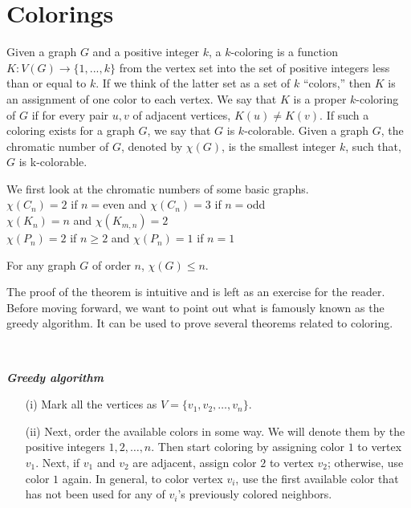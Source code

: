 \documentclass[../basic_graph_theory.tex]{subfiles}
\begin{document}
\chapter{Colorings}
\setcounter{chapter}{7} %
\setcounter{section}{0}
\setcounter{equation}{0}
\setcounter{figure}{0}

Given a graph $G$ and a positive integer $k$, a $k$-coloring is a function $K : V (G) \to \{1,...,k\}$ from the vertex set into the set of positive integers less than or equal to $k$. If we think of the latter set as a set of $k$ “colors,” then $K$ is an assignment of one color to each vertex. We say that $K$ is a proper $k$-coloring of $G$ if for every pair $u,v$ of adjacent vertices, $K(u) \neq K(v)$. If such a coloring exists for a graph $G$, we say that $G$ is $k$-colorable. Given a graph $G$, the chromatic number of $G$, denoted by $\chi(G)$, is the smallest integer $k$, such that, $G$ is k-colorable.

We first look at the chromatic numbers of some basic graphs.\\
$\chi(C_n)=2$ if $n=$even and $\chi(C_n)=3$ if $n=$odd\\
$\chi(K_n)=n$ and $\chi(K_{m,n})=2$\\
$\chi(P_n)=2$ if $n \ge 2$ and $\chi(P_n)=1$ if $n=1$

\begin{Thm}{}{}
    For any graph $G$ of order $n$, $\chi(G) \le n$.
\end{Thm}
The proof of the theorem is intuitive and is left as an exercise for the reader.\\
Before moving forward, we want to point out what is famously known as the greedy algorithm. It can be used to prove several theorems related to coloring.

\

\textbf{\textit{Greedy algorithm}}
\begin{enumerate}
    \item[(i)] Mark all the vertices as $V=\{v_1, v_2, \dots, v_n\}$.
    \item[(ii)] Next, order the available colors in some way. We will denote them by the positive integers $1,2,\dots,n$. Then start coloring by assigning color $1$ to vertex $v_1$. Next, if $v_1$ and $v_2$ are adjacent, assign color $2$ to vertex $v_2$; otherwise, use color $1$ again. In general, to color vertex $v_i$, use the first available color that has not been used for any of $v_i$'s previously colored neighbors.
\end{enumerate}
\end{document}

